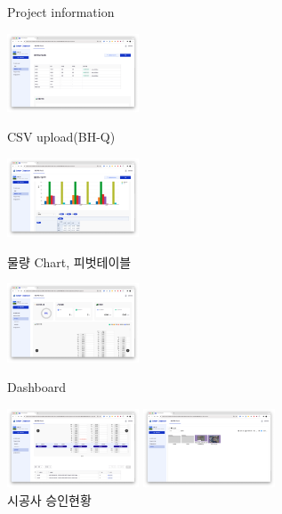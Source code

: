 \begin{itemize}
\begin{itemize}[label=$\star$]
\begin{figure}[!ht]
\begin{fullwidth}
{					            \caption*{Project information}
				            }\qquad
				            \parbox{0.35\textwidth}{
					            \centering
					            \includegraphics[width=0.35\textwidth]{images/smart-checker-csv-upload.png}
					            \caption*{CSV upload(BH-Q)}
				            }
				            \parbox{0.35\textwidth}{
					            \centering
					            \includegraphics[width=0.35\textwidth]{images/smart-checker-csv-upload-pivot.png}
					            \caption*{물량 Chart, 피벗테이블}
				            }\qquad
				            \parbox{0.35\textwidth}{
					            \centering
					            \includegraphics[width=0.35\textwidth]{images/smart-checker-dashboard.png}
					            \caption*{Dashboard}
				            }\qquad
				            \parbox{0.35\textwidth}{
					            \centering
					            \includegraphics[width=0.35\textwidth]{images/smart-checker-approval-status.png}
					            \caption*{시공사 승인현황}
				            }\qquad
				            \parbox{0.35\textwidth}{
					            \centering
					            \includegraphics[width=0.35\textwidth]{images/smart-checker-file-browser.png}
}
\end{fullwidth}
\end{figure}
\end{itemize}
\end{itemize}
